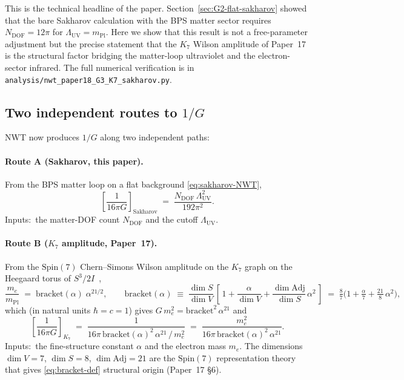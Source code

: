 \documentclass[11pt]{article}
\newcommand{\Adj}{\mathrm{Adj}}
\newcommand{\mPl}{m_{\mathrm{Pl}}}
\newcommand{\me}{m_e}
\begin{document}
This is the technical headline of the paper.  Section~\ref{sec:G2-flat-sakharov}
showed that the bare Sakharov calculation with the BPS matter
sector requires $N_{\mathrm{DOF}} = 12\pi$ for $\Lambda_{\mathrm{UV}}
= \mPl$.  Here we show that this result is not a free-parameter
adjustment but the precise statement that the $K_7$ Wilson amplitude
of Paper~17 is the structural factor bridging the matter-loop
ultraviolet and the electron-sector infrared.  The full numerical
verification is in
\texttt{analysis/nwt\_paper18\_G3\_K7\_sakharov.py}.

\subsection{Two independent routes to $1/G$}
\label{sec:G3-two-routes}

NWT now produces $1/G$ along two independent paths:

\paragraph{Route A (Sakharov, this paper).}  From the BPS
matter loop on a flat background \eqref{eq:sakharov-NWT},
\begin{equation}
  \left[\frac{1}{16\pi G}\right]_{\mathrm{Sakharov}}
   \;=\;
   \frac{N_{\mathrm{DOF}}\,\Lambda_{\mathrm{UV}}^2}{192\pi^2}.
  \label{eq:routeA}
\end{equation}
Inputs:\ the matter-DOF count $N_{\mathrm{DOF}}$ and the cutoff
$\Lambda_{\mathrm{UV}}$.

\paragraph{Route B ($K_7$ amplitude, Paper~17).}  From the
$\mathrm{Spin}(7)$ Chern--Simons Wilson amplitude on the $K_7$ graph
on the Heegaard torus of $S^3/2I$~\cite{paper17},
\begin{equation}
  \frac{\me}{\mPl}
   \;=\;
   \mathrm{bracket}(\alpha)\;\alpha^{21/2},
  \qquad
  \mathrm{bracket}(\alpha)
   \;\equiv\;
   \frac{\dim S}{\dim V}\,
   \left[\,1 + \frac{\alpha}{\dim V} + \frac{\dim \Adj}{\dim S}\,\alpha^2\,\right]
   \;=\;
   \tfrac{8}{7}\bigl(1 + \tfrac{\alpha}{7} + \tfrac{21}{8}\,\alpha^2\bigr),
  \label{eq:bracket-def}
\end{equation}
which (in natural units $\hbar = c = 1$) gives
$G\,\me^2 = \mathrm{bracket}^2\,\alpha^{21}$ and
\begin{equation}
  \left[\frac{1}{16\pi G}\right]_{K_7}
   \;=\;
   \frac{1}{16\pi\,\mathrm{bracket}(\alpha)^2\,\alpha^{21}\,/\,\me^2}
   \;=\;
   \frac{\me^2}{16\pi\,\mathrm{bracket}(\alpha)^2\,\alpha^{21}}.
  \label{eq:routeB}
\end{equation}
Inputs:\ the fine-structure constant $\alpha$ and the electron
mass $\me$.  The dimensions $\dim V = 7$, $\dim S = 8$,
$\dim\Adj = 21$ are the $\mathrm{Spin}(7)$ representation theory
that gives \eqref{eq:bracket-def} structural origin (Paper~17 \S6).
\end{document}

